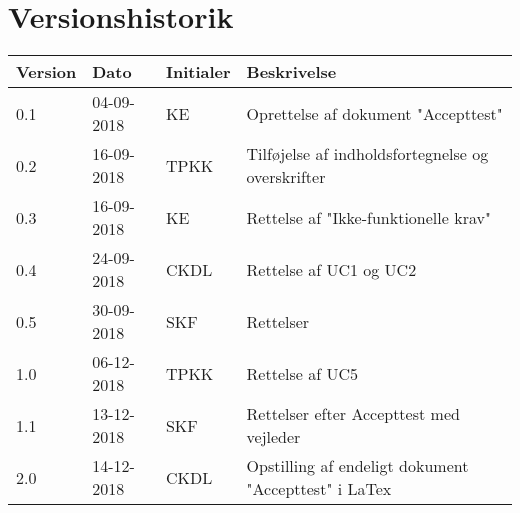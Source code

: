 \chapter*{Versionshistorik}

\begin{table}[h!]
	\begin{tabular}{l|l|l|l}
		{\color[HTML]{187ABD} \textbf{Version}} & {\color[HTML]{187ABD} \textbf{Dato}} & {\color[HTML]{187ABD} \textbf{Initialer}} & {\color[HTML]{187ABD} \textbf{Beskrivelse}} \\ \hline
		0.1 & {\color[HTML]{000000} 04-09-2018} & KE & Oprettelse af dokument "Accepttest" \\ \hline
		0.2 & 16-09-2018 & TPKK & Tilføjelse af indholdsfortegnelse og overskrifter \\ \hline
		0.3 & 16-09-2018 & KE & Rettelse af "Ikke-funktionelle krav" \\ \hline
		0.4 & 24-09-2018 & CKDL & Rettelse af UC1 og UC2 \\ \hline
		0.5 & 30-09-2018 & SKF & Rettelser \\ \hline
		1.0 & 06-12-2018 & TPKK & Rettelse af UC5 \\ \hline
		1.1 & 13-12-2018 & SKF & Rettelser efter Accepttest med vejleder \\ \hline
		2.0 & 14-12-2018 & CKDL & Opstilling af endeligt dokument "Accepttest" i LaTex
	\end{tabular}
\end{table}

\clearpage